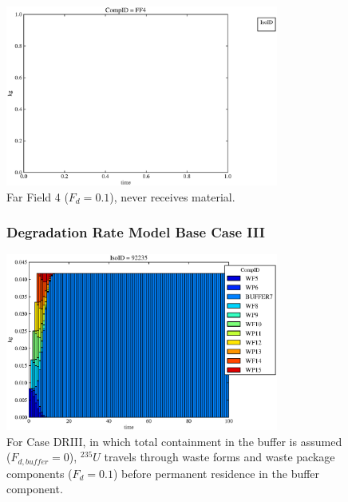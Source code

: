 \begin{frame}
\begin{figure}
\begin{minipage}[b]{0.45\linewidth}
  \includegraphics[width=0.8\textwidth]{./images/drII0.eps}
  \caption[Case DRII Far Field Contaminants.]{ 
    Far Field 4 ($F_d = 0.1$), never receives material.
    }
  \label{fig:drIIff0}


  \end{minipage}
\end{figure}
\end{frame}

\begin{frame}[ctb!]
\begin{figure}[ht]
  \frametitle{Degradation Rate Model Base Case III}
\centering
\includegraphics[width=0.8\textwidth]{./images/drIII.eps}
\caption[$^{235}U$ residence. Degradation Rate Buffer No Release.]{
For Case DRIII, in which total containment in the buffer is assumed ($F_{d,buffer}=0$), 
$^{235}U$ travels through waste forms and waste package components ($F_d = 0.1$) before 
permanent residence in the buffer component.
}
\label{fig:drIIIall}
\end{figure}
\end{frame}

